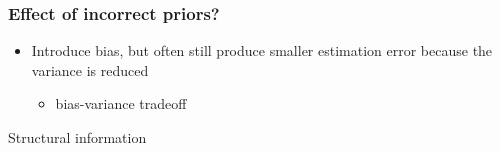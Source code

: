 \documentclass[english,t]{beamer}
\begin{document}
\begin{frame}

  \frametitle{Effect of incorrect priors?}
  
  \begin{itemize}
  \item Introduce bias, but often still produce smaller estimation
    error because the variance is reduced
    \begin{itemize}
    \item bias-variance tradeoff
    \end{itemize}
  \end{itemize}  
  
\end{frame}

\begin{frame}{Structural information }


\end{frame}
\end{document}
